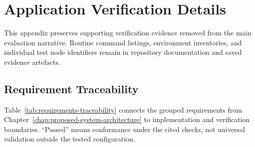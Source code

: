 \chapter{Application Verification Details}
\label{app:verification-details}

This appendix preserves supporting verification evidence removed from the main evaluation narrative. Routine command listings, environment inventories, and individual test node identifiers remain in repository documentation and saved evidence artefacts.

\section{Requirement Traceability}

Table~\ref{tab:requirements-traceability} connects the grouped requirements from Chapter~\ref{chap:proposed-system-architecture} to implementation and verification boundaries. ``Passed'' means conformance under the cited checks, not universal validation outside the tested configuration.

